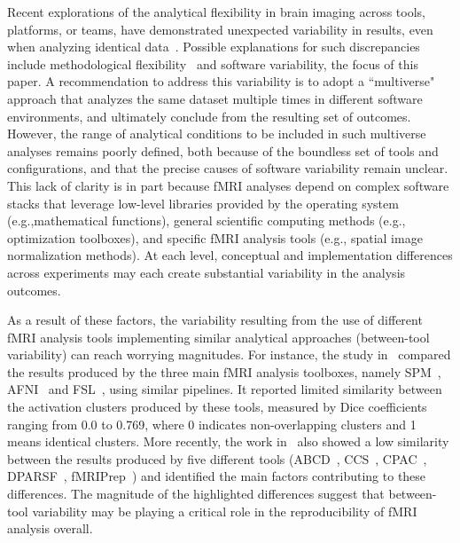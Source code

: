 \documentclass[11pt,onecolumn]{article}
\begin{document}
Recent explorations of the analytical flexibility in brain imaging across
tools, platforms, or teams, have demonstrated unexpected variability in
results, even when analyzing identical data~\cite{botvinik2020variability}. Possible explanations for
such discrepancies include methodological flexibility~\cite{carp2012plurality} and software
variability, the focus of this paper. A recommendation to address this
variability is to adopt a ``multiverse" approach that analyzes the same
dataset multiple times in different software environments, and ultimately
conclude from the resulting set of outcomes. However, the range of
analytical conditions to be included in such multiverse analyses remains
poorly defined, both because of the boundless set of tools and
configurations, and that the precise causes of software variability remain
unclear. This lack of clarity is in part because fMRI analyses depend on
complex software stacks that leverage low-level libraries provided by the
operating system (e.g.,mathematical functions), general scientific
computing methods (e.g., optimization toolboxes), and specific fMRI
analysis tools (e.g., spatial image normalization methods). At each level,
conceptual and implementation differences across experiments may each
create substantial variability in the analysis outcomes.

As a result of these factors, the variability resulting from the use of
different fMRI analysis tools implementing similar analytical approaches
(between-tool variability) can reach worrying magnitudes. For instance, the
study in~\cite{bowring2019exploring} compared the results produced by the
three main fMRI analysis toolboxes, namely SPM~\cite{penny2011statistical},
AFNI~\cite{cox1996afni} and FSL~\cite{jenkinson2012fsl}, using similar
pipelines. It reported limited similarity between the activation clusters
produced by these tools, measured by Dice coefficients ranging from 0.0 to
0.769, where 0 indicates non-overlapping
clusters and 1 means identical clusters. More recently, the work
in~\cite{Li2021.12.01.470790} also showed a low similarity between the
results produced by five different tools (ABCD~\cite{feczko2021adolescent},
CCS~\cite{xu2015connectome}, CPAC~\cite{craddock2013towards}, DPARSF~\cite{yan2010dparsf},
fMRIPrep~\cite{esteban2019fmriprep}) and identified the main
factors contributing to these differences. The magnitude of the highlighted
differences suggest that between-tool variability may be playing a critical
role in the reproducibility of fMRI analysis overall. 
\end{document}
